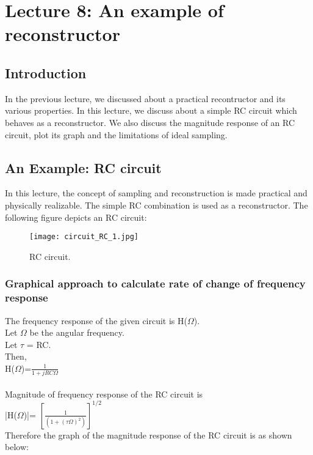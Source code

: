 \section{Lecture 8: An example of reconstructor }

\subsection{Introduction}
In the previous lecture, we discussed about a practical recontructor and its various properties. In this lecture, we discuss about a simple RC circuit which behaves as a reconstructor. We also discuss the magnitude response of an RC circuit, plot its graph and the limitations of ideal sampling.  

\subsection{An Example: RC circuit}
In this lecture, the concept of sampling and reconstruction is made practical and physically realizable. The simple RC combination is used as a reconstructor. The following figure depicts an RC circuit:


\begin{figure}[ht]
\centering
\texttt{[image: circuit\_RC\_1.jpg]}
\caption{RC circuit.}
\end{figure}

\subsubsection{Graphical approach to calculate rate of change of frequency response}

\noindent The frequency response of the given circuit is H($\Omega$).\\
Let $\Omega$ be the angular frequency.\\
Let $\tau$ = RC.\\
Then,\\ 
H($\Omega$)=$\frac{1}{1+jRC\Omega}$\\
\\
\large Magnitude of frequency response of the RC circuit is  \\

|H($\Omega$)|= $[\frac{1}{(1+(\tau \Omega)^2)}]^{1/2}$\\

\noindent Therefore the graph of the magnitude response of the RC circuit is as shown below:\\

